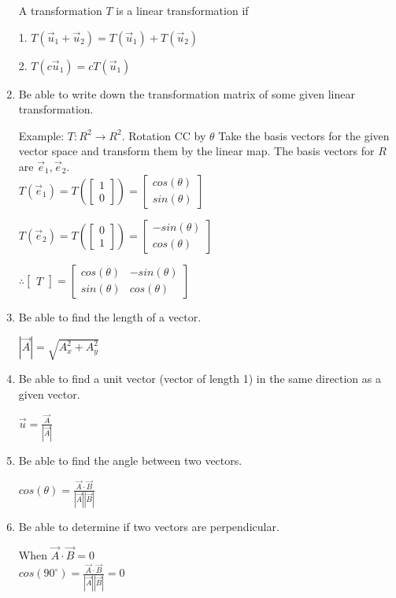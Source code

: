 \documentclass{article}
\begin{document}
\begin{enumerate}
        A transformation $T$ is a linear transformation if

        1. $T(\vec{u}_1 + \vec{u}_2) = T(\vec{u}_1) + T(\vec{u}_2)$

        2. $T(c\vec{u}_1) = cT(\vec{u}_1)$

    \item Be able to write down the transformation matrix of some given linear transformation.

        Example: $ T: R^2 \longrightarrow R^2 $. Rotation CC by $\theta$
        Take the basis vectors for the given vector space and transform them by the linear map.
        The basis vectors for $R$ are $\vec{e}_1, \vec{e}_2$.\\

        $T(\vec{e}_1) =
        T(\begin{bmatrix}
        1\\
        0
        \end{bmatrix})
        =
        \begin{bmatrix}
        cos(\theta)\\
        sin(\theta)
        \end{bmatrix}$

        $T(\vec{e}_2) =
        T(\begin{bmatrix}
        0\\
        1
        \end{bmatrix})
        =
        \begin{bmatrix}
        -sin(\theta)\\
        cos(\theta)
        \end{bmatrix}$

        $\therefore
        \begin{bmatrix}
            T
        \end{bmatrix}
        =
        \begin{bmatrix}
        cos(\theta) & -sin(\theta)\\
        sin(\theta) & cos(\theta)
        \end{bmatrix}
        $


    \item Be able to find the length of a vector.

    $|\vec{A}| = \sqrt{A_x^2 + A_y^2}$

    \item Be able to find a unit vector (vector of length 1) in the same direction as a given vector.

    $\vec{u} = \frac{\vec{A}}{|\vec{A}|}$
    \item Be able to find the angle between two vectors.

    $cos(\theta) = \frac{\vec{A} \cdot \vec{B}}{|\vec{A}||\vec{B}|}$
    \item Be able to determine if two vectors are perpendicular.

    When $\vec{A} \cdot \vec{B} = 0$\\
    $cos(90^\circ) = \frac{\vec{A} \cdot \vec{B}}{|\vec{A}||\vec{B}|} = 0$
\end{enumerate}
\end{document}
